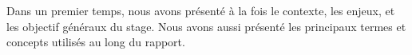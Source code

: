 %
%
%
%
%



Dans un premier temps, nous avons présenté à la fois le contexte, les enjeux, et les objectif généraux du stage. Nous avons aussi présenté les principaux termes et concepts utilisés au long du rapport.


